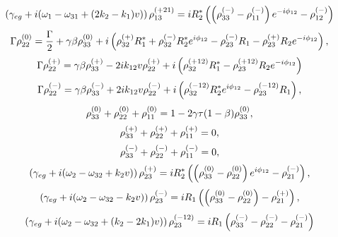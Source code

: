 \begin{equation}
    \left(\gamma_{eg}+i(\omega_{1}-\omega_{31}+(2k_2-k_1)v)\right)\rho^{(+21)}_{13}=iR_2^*\left(\left(\rho^{(-)}_{33}-\rho^{(-)}_{11}\right)e^{-i\phi_{12}}-\rho^{(-)}_{12}\right)
\end{equation}
\begin{equation}
    \Gamma \rho^{(0)}_{22}=\frac{\Gamma}{2}+\gamma\beta\rho^{(0)}_{33}+i\left(\rho^{(+)}_{32}R_1^*+\rho^{(-)}_{32}R_2^*e^{i\phi_{12}}-\rho^{(-)}_{23}R_1 -\rho^{(+)}_{23}R_2e^{ - i\phi_{12}} \right),
\end{equation}
\begin{equation}
    \Gamma\rho^{(+)}_{22} = \gamma\beta\rho^{(+)}_{33} - 2ik_{12}v\rho^{(+)}_{22} + i\left( \rho^{(+12)}_{32}R_1^* - \rho^{(+12)}_{23}R_2e^{-i\phi_{12}} \right)
\end{equation}
\begin{equation}
    \Gamma\rho^{(-)}_{22} = \gamma\beta\rho^{(-)}_{33} + 2ik_{12}v\rho^{(-)}_{22} + i\left( \rho^{(-12)}_{32}R_2^*e^{i\phi_{12}} - \rho^{(-12)}_{23}R_1 \right),
\end{equation}
\begin{equation}
    \rho^{(0)}_{33}+\rho^{(0)}_{22}+\rho^{(0)}_{11}=1-2\gamma\tau(1-\beta)\rho^{(0)}_{33},
\end{equation}
\begin{equation}
    \rho^{(+)}_{33}+\rho^{(+)}_{22}+\rho^{(+)}_{11}=0,
\end{equation}
\begin{equation}
    \rho^{(-)}_{33}+\rho^{(-)}_{22}+\rho^{(-)}_{11}=0,
\end{equation}
\begin{equation}
    \left(\gamma_{eg}+i(\omega_2-\omega_{32}+k_2v)\right)\rho^{(+)}_{23}=iR_2^*\left(\left(\rho^{(0)}_{33}-\rho^{(0)}_{22}\right)e^{i\phi_{12}}-\rho^{(-)}_{21}\right),
\end{equation}
\begin{equation}
    \left(\gamma_{eg}+i(\omega_2-\omega_{32}-k_2v)\right)\rho^{(-)}_{23}=iR_1\left(\left(\rho^{(0)}_{33}-\rho^{(0)}_{22}\right)-\rho^{(+)}_{21}\right),
\end{equation}
\begin{equation}
    \left(\gamma_{eg}+i(\omega_2-\omega_{32}+(k_2-2k_1)v)\right)\rho^{(-12)}_{23} = iR_1\left(\rho^{(-)}_{33}-\rho^{(-)}_{22}-\rho^{(-)}_{21}\right)
\end{equation}


\FloatBarrier
